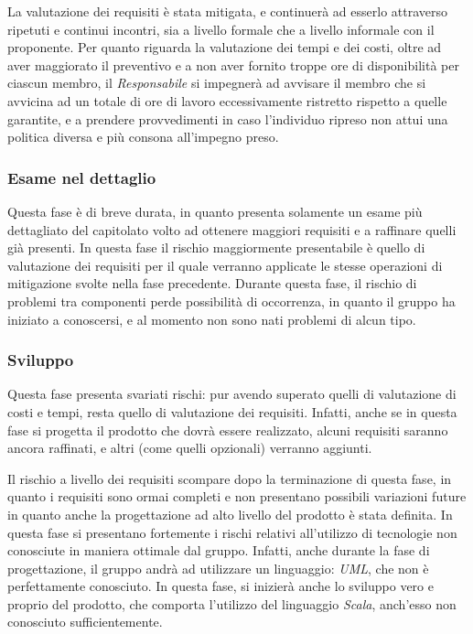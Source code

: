 \documentclass[a4paper]{article}
\begin{document}
				La valutazione dei requisiti è stata mitigata, e continuerà ad esserlo attraverso ripetuti e continui incontri, sia a livello formale 
				che a livello informale con il proponente. Per quanto riguarda la valutazione dei tempi e dei costi, oltre ad aver maggiorato il 
				preventivo e a non aver fornito troppe ore di disponibilità per ciascun membro, il \emph{Responsabile} si impegnerà ad avvisare il 
				membro che si avvicina ad un totale di ore di lavoro eccessivamente ristretto rispetto a quelle garantite, e a prendere provvedimenti 
				in caso l'individuo ripreso non attui una politica diversa e più consona all'impegno preso.
				
			\subsubsection{Esame nel dettaglio}
				Questa fase è di breve durata, in quanto presenta solamente un esame più dettagliato del capitolato volto ad ottenere maggiori requisiti 
				e a raffinare quelli già presenti.
				In questa fase il rischio maggiormente presentabile è quello di valutazione dei requisiti per il quale verranno applicate le stesse 
				operazioni di mitigazione svolte nella fase precedente. Durante questa fase, il rischio di problemi tra componenti perde possibilità di 
				occorrenza, in quanto il gruppo ha iniziato a conoscersi, e al momento non sono nati problemi di alcun tipo. 
				
			\subsubsection{Sviluppo}
				Questa fase presenta svariati rischi: pur avendo superato quelli di valutazione di costi e tempi, resta quello di valutazione dei 
				requisiti. Infatti, anche se in questa fase si progetta il prodotto che dovrà essere realizzato, alcuni requisiti saranno ancora 
				raffinati, e altri (come quelli opzionali) verranno aggiunti.
				
				Il rischio a livello dei requisiti scompare dopo la terminazione di questa fase, in quanto i requisiti sono ormai completi e non 
				presentano possibili variazioni future in quanto anche la progettazione ad alto livello del prodotto è stata definita.
				In questa fase si presentano fortemente i rischi relativi all'utilizzo di tecnologie non conosciute in maniera ottimale dal gruppo. 
				Infatti, anche durante la fase di progettazione, il gruppo andrà ad utilizzare un linguaggio: \emph{UML}, che non è perfettamente 
				conosciuto. In questa fase, si inizierà anche lo sviluppo vero e proprio del prodotto, che comporta l'utilizzo del linguaggio 
				\emph{Scala}, anch'esso non conosciuto sufficientemente.
				
\end{document}
